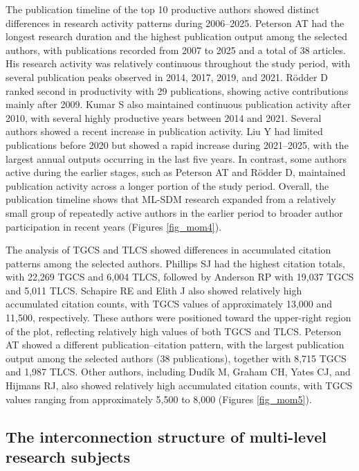 \documentclass[authoryear,preprint,review,12pt]{elsarticle}
\begin{document}
The publication timeline of the top 10 productive authors showed distinct differences in research activity patterns during 2006–2025. Peterson AT had the longest research duration and the highest publication output among the selected authors, with publications recorded from 2007 to 2025 and a total of 38 articles. His research activity was relatively continuous throughout the study period, with several publication peaks observed in 2014, 2017, 2019, and 2021. Rödder D ranked second in productivity with 29 publications, showing active contributions mainly after 2009. Kumar S also maintained continuous publication activity after 2010, with several highly productive years between 2014 and 2021. Several authors showed a recent increase in publication activity. Liu Y had limited publications before 2020 but showed a rapid increase during 2021–2025, with the largest annual outputs occurring in the last five years. In contrast, some authors active during the earlier stages, such as Peterson AT and Rödder D, maintained publication activity across a longer portion of the study period. Overall, the publication timeline shows that ML-SDM research expanded from a relatively small group of repeatedly active authors in the earlier period to broader author participation in recent years (Figures \ref{fig_mom4}).

The analysis of TGCS and TLCS showed differences in accumulated citation patterns among the selected authors. Phillips SJ had the highest citation totals, with 22,269 TGCS and 6,004 TLCS, followed by Anderson RP with 19,037 TGCS and 5,011 TLCS. Schapire RE and Elith J also showed relatively high accumulated citation counts, with TGCS values of approximately 13,000 and 11,500, respectively. These authors were positioned toward the upper-right region of the plot, reflecting relatively high values of both TGCS and TLCS. Peterson AT showed a different publication–citation pattern, with the largest publication output among the selected authors (38 publications), together with 8,715 TGCS and 1,987 TLCS. Other authors, including Dudík M, Graham CH, Yates CJ, and Hijmans RJ, also showed relatively high accumulated citation counts, with TGCS values ranging from approximately 5,500 to 8,000 (Figures \ref{fig_mom5}).


\subsection{The interconnection structure of multi-level research subjects}
\end{document}
